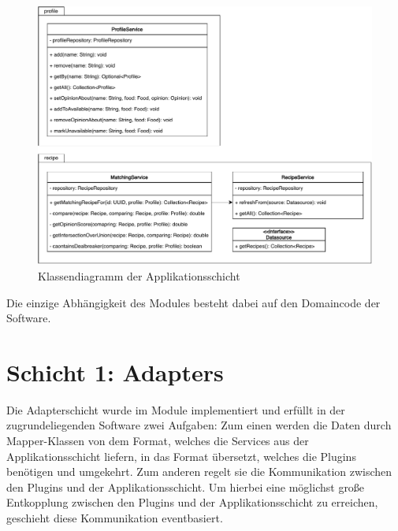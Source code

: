 \begin{figure}[ht!]
    \includegraphics[width=0.98\columnwidth]{../diagrams/application_uml.pdf}
    \caption{Klassendiagramm der Applikationsschicht}
    \label{fig:class-diag-application}
\end{figure}

Die einzige Abhängigkeit des Modules besteht dabei auf den Domaincode der Software.

\section{Schicht 1: Adapters}
Die Adapterschicht wurde im Module  implementiert und erfüllt in der zugrundeliegenden Software zwei Aufgaben: Zum einen werden die Daten durch Mapper-Klassen von dem Format, welches die Services aus der Applikationsschicht liefern, in das Format übersetzt, welches die Plugins benötigen und umgekehrt. Zum anderen regelt sie die Kommunikation zwischen den Plugins und der Applikationsschicht. Um hierbei eine möglichst große Entkopplung zwischen den Plugins und der Applikationsschicht zu erreichen, geschieht diese Kommunikation eventbasiert.

